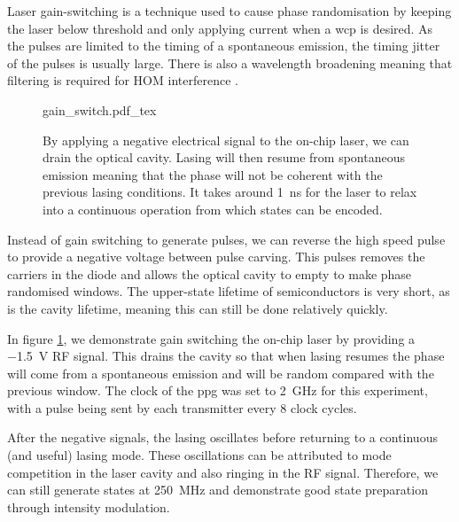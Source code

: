 
Laser gain-switching is a technique used to cause phase randomisation by keeping the laser below threshold and only applying current when a \ac{wcp} is desired. As the pulses are limited to the timing of a spontaneous emission, the timing jitter of the pulses is usually large. There is also a wavelength broadening meaning that filtering is required for \ac{HOM} interference \cite{Agnesi2019}. 

\begin{figure}[tp]
	\centering
	\def\svgwidth{0.8\textwidth} 
	{gain_switch.pdf_tex}
	\caption[Gain switching of the on-chip lasers at \SI{250}{MHz}]{By applying a negative electrical signal to the on-chip laser, we can drain the optical cavity. Lasing will then resume from spontaneous emission meaning that the phase will not be coherent with the previous lasing conditions. It takes around \SI{1}{\ns} for the laser to relax into a continuous operation from which states can be encoded.}
	\label{fig:gain_switch}
\end{figure}

Instead of gain switching to generate pulses, we can reverse the high speed pulse to provide a negative voltage between pulse carving. This pulses removes the carriers in the diode and allows the optical cavity to empty to make phase randomised windows. The upper-state lifetime of semiconductors is very short, as is the cavity lifetime, meaning this can still be done relatively quickly. 

In figure \ref{fig:gain_switch}, we demonstrate gain switching the on-chip laser by providing a \SI{-1.5}{V} RF signal. This drains the cavity so that when lasing resumes the phase will come from a spontaneous emission and will be random compared with the previous window. The clock of the \ac{ppg} was set to \SI{2}{GHz} for this experiment, with a pulse being sent by each transmitter every 8 clock cycles. 

After the negative signals, the lasing oscillates before returning to a continuous (and useful) lasing mode. These oscillations can be attributed to mode competition in the laser cavity and also ringing in the RF signal. Therefore, we can still generate states at \SI{250}{MHz} and demonstrate good state preparation through intensity modulation.

